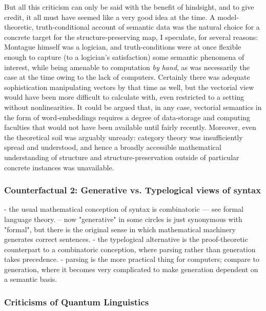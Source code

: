 But all this criticism can only be said with the benefit of hindsight, and to give credit, it all must have seemed like a very good idea at the time. A model-theoretic, truth-conditional account of semantic data was the natural choice for a concrete target for the structure-preserving map, I speculate, for several reasons: Montague himself was a logician, and truth-conditions were at once flexible enough to capture (to a logician's satisfaction) some semantic phenomena of interest, while being amenable to computation \emph{by hand}, as was necessarily the case at the time owing to the lack of computers. Certainly there was adequate sophistication manipulating vectors by that time as well, but the vectorial view would have been more difficult to calculate with, even restricted to a setting without nonlinearities. It could be argued that, in any case, vectorial semantics in the form of word-embeddings requires a degree of data-storage and computing faculties that would not have been available until fairly recently. Moreover, even the theoretical soil was arguably unready: category theory was insufficiently spread and understood, and hence a broadly accessible mathematical understanding of structure and structure-preservation outside of particular concrete instances was unavailable.

\subsubsection{Counterfactual 2: Generative vs. Typelogical views of syntax}

- the usual mathematical conception of syntax is combinatoric --- see formal language theory.
-- now "generative" in some circles is just synonymous with "formal", but there is the original sense in which mathematical machinery generates correct sentences.
- the typelogical alternative is the proof-theoretic counterpart to a combinatoric conception, where parsing rather than generation takes precedence.
- parsing is the more practical thing for computers; compare to generation, where it becomes very complicated to make generation dependent on a semantic basis.

\subsubsection{Criticisms of Quantum Linguistics}

